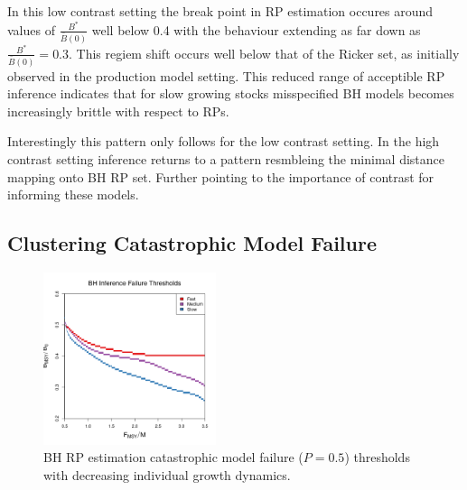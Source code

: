 %
In this low contrast setting the break point in RP estimation occures around values of
$\frac{B^*}{\bar B(0)}$ well below 0.4 with the behaviour extending as far down as 
\mbox{$\frac{B^*}{\bar B(0)}=0.3$}. This regiem shift occurs well below that of the Ricker
set, as initially observed in the production model setting.
This reduced range of acceptible RP inference indicates that for slow growing stocks 
misspecified BH models becomes increasingly brittle with respect to RPs.

%
Interestingly this pattern only follows for the low contrast setting. In the high
contrast setting inference returns to a pattern resmbleing the minimal distance
mapping onto BH RP set. Further pointing to the importance of contrast for informing
these models.

%

%
\subsection{Clustering Catastrophic Model Failure}

\begin{figure}
\includegraphics[width=0.45\textwidth]{../ddBias/relErrorImagesBHDD0.5.png}
\vspace{-0.5cm}
\caption{BH RP estimation catastrophic model failure ($P=0.5$) thresholds with decreasing individual growth dynamics.
}\label{breaks}
\end{figure}

